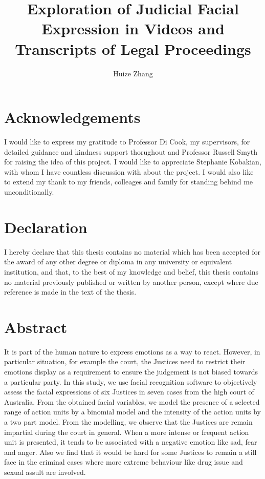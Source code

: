 \documentclass{monashthesis}
\author{Huize Zhang}
\title{Exploration of Judicial Facial Expression in Videos and Transcripts of Legal Proceedings}
\begin{document}

\titlepage

{\sf\tighttoc\doublespacing}

\clearpage{}\setcounter{page}{0}

\hypertarget{acknowledgements}{%
\chapter*{Acknowledgements}\label{acknowledgements}}

I would like to express my gratitude to Professor Di Cook, my supervisors, for detailed guidance and kindness support thorughout and Professor Russell Smyth for raising the idea of this project. I would like to appreciate Stephanie Kobakian, with whom I have countless discussion with about the project. I would also like to extend my thank to my friends, colleages and family for standing behind me unconditionally.

\hypertarget{declaration}{%
\chapter*{Declaration}\label{declaration}}

I hereby declare that this thesis contains no material which has been accepted for the award of any other degree or diploma in any university or equivalent institution, and that, to the best of my knowledge and belief, this thesis contains no material previously published or written by another person, except where due reference is made in the text of the thesis.

\vspace*{2cm}\par\authorname

\hypertarget{abstract}{%
\chapter*{Abstract}\label{abstract}}

It is part of the human nature to express emotions as a way to react. However, in particular situation, for example the court, the Justices need to restrict their emotions display as a requirement to ensure the judgement is not biased towards a particular party. In this study, we use facial recognition software to objectively assess the facial expressions of six Justices in seven cases from the high court of Australia. From the obtained facial variables, we model the presence of a selected range of action units by a binomial model and the intensity of the action units by a two part model. From the modelling, we observe that the Justices are remain impartial during the court in general. When a more intense or frequent action unit is presented, it tends to be associated with a negative emotion like sad, fear and anger. Also we find that it would be hard for some Justices to remain a still face in the criminal cases where more extreme behaviour like drug issue and sexual assult are involved.
\end{document}
